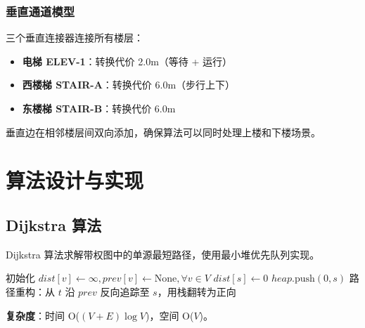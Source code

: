 \documentclass[11pt,a4paper]{ctexart}
\begin{document}
\subsubsection{垂直通道模型}

三个垂直连接器连接所有楼层：

\begin{itemize}
    \item \textbf{电梯 ELEV-1}：转换代价 2.0m（等待 + 运行）
    \item \textbf{西楼梯 STAIR-A}：转换代价 6.0m（步行上下）
    \item \textbf{东楼梯 STAIR-B}：转换代价 6.0m
\end{itemize}

垂直边在相邻楼层间双向添加，确保算法可以同时处理上楼和下楼场景。

\section{算法设计与实现}

\subsection{Dijkstra 算法}

Dijkstra 算法求解带权图中的单源最短路径，使用最小堆优先队列实现。

\begin{algorithm}[H]
\SetAlgoLined
{}
初始化 $dist[v] \leftarrow \infty, prev[v] \leftarrow \text{None}, \forall v \in V$\;
$dist[s] \leftarrow 0$\;
$heap.\text{push}(0, s)$\;
路径重构：从 $t$ 沿 $prev$ 反向追踪至 $s$，用栈翻转为正向\;
\caption{Dijkstra 算法}
\end{algorithm}

\textbf{复杂度}：时间 O($(V+E)\log V$)，空间 O($V$)。
\end{document}
